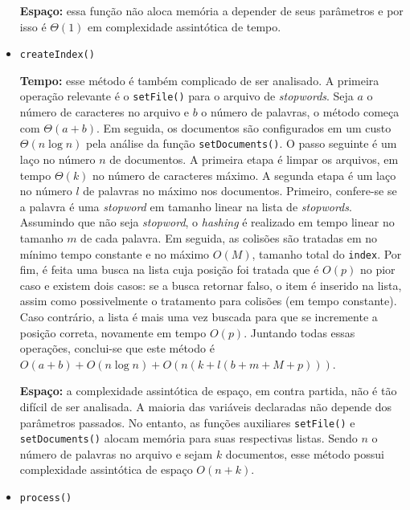 \documentclass{article}
\def\code#1{\texttt{#1}}
\begin{document}
\begin{itemize}
	      \textbf{Espaço:} essa função não aloca memória a depender de seus parâmetros e por isso é \( \Theta(1) \) em complexidade assintótica de tempo.

	\item \code{createIndex()}

	      \textbf{Tempo:} esse método é também complicado de ser analisado. A primeira operação relevante é o \code{setFile()} para o arquivo de \textit{stopwords}. Seja \( a \) o número de caracteres no arquivo e \( b \) o número de palavras, o método começa com \( \Theta(a+b) \). Em seguida, os documentos são configurados em um custo \( \Theta(n \log n) \) pela análise da função \code{setDocuments()}. O passo seguinte é um laço no número \( n \) de documentos. A primeira etapa é limpar os arquivos, em tempo \( \Theta(k) \) no número de caracteres máximo. A segunda etapa é um laço no número \( l \) de palavras no máximo nos documentos. Primeiro, confere-se se a palavra é uma \textit{stopword} em tamanho linear na lista de \textit{stopwords}. Assumindo que não seja \textit{stopword}, o \textit{hashing} é realizado em tempo linear no tamanho \( m \) de cada palavra. Em seguida, as colisões são tratadas em no mínimo tempo constante e no máximo \( O(M) \), tamanho total do \code{index}. Por fim, é feita uma busca na lista cuja posição foi tratada que é \( O(p) \) no pior caso e existem dois casos: se a busca retornar falso, o item é inserido na lista, assim como possivelmente o tratamento para colisões (em tempo constante). Caso contrário, a lista é mais uma vez buscada para que se incremente a posição correta, novamente em tempo \( O(p) \). Juntando todas essas operações, conclui-se que este método é \( O(a+b) + O(n \log n) + O(n (k + l (b + m + M + p))) \).

	      \textbf{Espaço:} a complexidade assintótica de espaço, em contra partida, não é tão difícil de ser analisada. A maioria das variáveis declaradas não depende dos parâmetros passados. No entanto, as funções auxiliares \code{setFile()} e \code{setDocuments()} alocam memória para suas respectivas listas. Sendo \( n \) o número de palavras no arquivo e sejam \( k \) documentos, esse método possui complexidade assintótica de espaço \( O(n+k) \).

	\item \code{process()}


\end{itemize}
\end{document}
